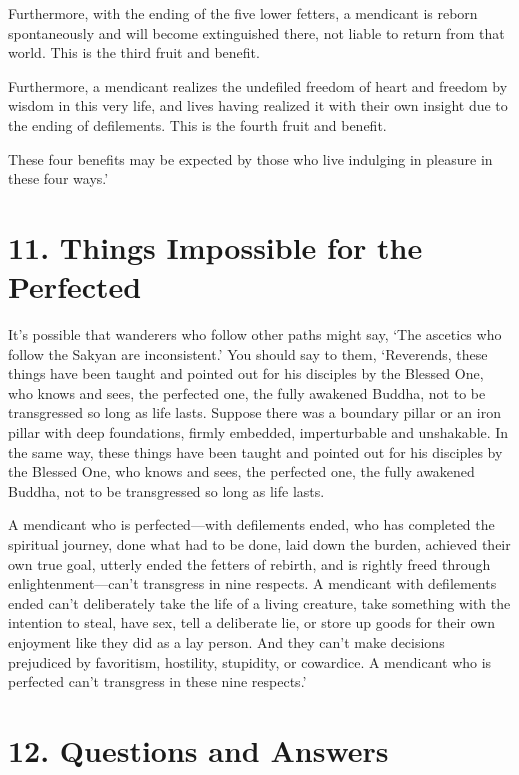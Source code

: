 \documentclass[12pt,openany]{book}%
\begin{document}
Furthermore, with the ending of the five lower fetters, a mendicant is reborn spontaneously and will become extinguished there, not liable to return from that world. This is the third fruit and benefit. 

Furthermore, a mendicant realizes the undefiled freedom of heart and freedom by wisdom in this very life, and lives having realized it with their own insight due to the ending of defilements. This is the fourth fruit and benefit. 

These four benefits may be expected by those who live indulging in pleasure in these four ways.’ 

\section*{11. Things Impossible for the Perfected }

It’s possible that wanderers who follow other paths might say, ‘The ascetics who follow the Sakyan are inconsistent.’ You should say to them, ‘Reverends, these things have been taught and pointed out for his disciples by the Blessed One, who knows and sees, the perfected one, the fully awakened Buddha, not to be transgressed so long as life lasts. Suppose there was a boundary pillar or an iron pillar with deep foundations, firmly embedded, imperturbable and unshakable. In the same way, these things have been taught and pointed out for his disciples by the Blessed One, who knows and sees, the perfected one, the fully awakened Buddha, not to be transgressed so long as life lasts. 

A mendicant who is perfected—with defilements ended, who has completed the spiritual journey, done what had to be done, laid down the burden, achieved their own true goal, utterly ended the fetters of rebirth, and is rightly freed through enlightenment—can’t transgress in nine respects. A mendicant with defilements ended can’t deliberately take the life of a living creature, take something with the intention to steal, have sex, tell a deliberate lie, or store up goods for their own enjoyment like they did as a lay person. And they can’t make decisions prejudiced by favoritism, hostility, stupidity, or cowardice. A mendicant who is perfected can’t transgress in these nine respects.’ 

\section*{12. Questions and Answers }
\end{document}
